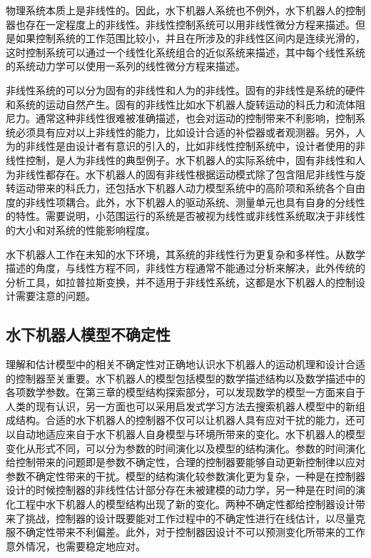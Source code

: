 物理系统本质上是非线性的。因此，水下机器人系统也不例外，水下机器人的控制器也存在一定程度上的非线性。非线性控制系统可以用非线性微分方程来描述。但是如果控制系统的工作范围比较小，并且在所涉及的非线性区间内是连续光滑的，这时控制系统可以通过一个线性化系统组合的近似系统来描述，其中每个线性系统的系统动力学可以使用一系列的线性微分方程来描述。

非线性系统的可以分为固有的非线性和人为的非线性。固有的非线性是系统的硬件和系统的运动自然产生。固有的非线性比如水下机器人旋转运动的科氏力和流体阻尼力。通常这种非线性很难被准确描述，也会对运动的控制带来不利影响，控制系统必须具有应对以上非线性的能力，比如设计合适的补偿器或者观测器。另外，人为的非线性是由设计者有意识的引入的，比如非线性控制系统中，设计者使用的非线性控制，是人为非线性的典型例子。水下机器人的实际系统中，固有非线性和人为非线性都存在。水下机器人的固有非线性根据运动模式除了包含阻尼非线性与旋转运动带来的科氏力，还包括水下机器人动力模型系统中的高阶项和系统各个自由度的非线性项耦合。此外，水下机器人的驱动系统、测量单元也具有自身的分线性的特性。需要说明，小范围运行的系统是否被视为线性或非线性系统取决于非线性的大小和对系统的性能影响程度。

水下机器人工作在未知的水下环境，其系统的非线性行为更复杂和多样性。从数学描述的角度，与线性方程不同，非线性方程通常不能通过分析来解决，此外传统的分析工具，如拉普拉斯变换，并不适用于非线性系统，这都是水下机器人的控制设计需要注意的问题。


\subsection{水下机器人模型不确定性 }

理解和估计模型中的相关不确定性对正确地认识水下机器人的运动机理和设计合适的控制器至关重要。水下机器人的模型包括模型的数学描述结构以及数学描述中的各项数学参数。在第三章的模型结构探索部分，可以发现数学的模型一方面来自于人类的现有认识，另一方面也可以采用启发式学习方法去搜索机器人模型中的新组成结构。合适的水下机器人的控制器不仅可以让机器人具有应对干扰的能力，还可以自动地适应来自于水下机器人自身模型与环境所带来的变化。水下机器人的模型变化从形式不同，可以分为参数的时间演化以及模型的结构演化。参数的时间演化给控制带来的问题即是参数不确定性，合理的控制器要能够自动更新控制律以应对参数不确定性带来的干扰。模型的结构演化较参数演化更为复杂，一种是在控制器设计的时候控制器的非线性估计部分存在未被建模的动力学，另一种是在时间的演化工程中水下机器人的模型结构出现了新的变化。两种不确定性都给控制器设计带来了挑战，控制器的设计既要能对工作过程中的不确定性进行在线估计，以尽量克服不确定性带来不利偏差。此外，对于控制器因设计不可以预测变化所带来的工作意外情况，也需要稳定地应对。

